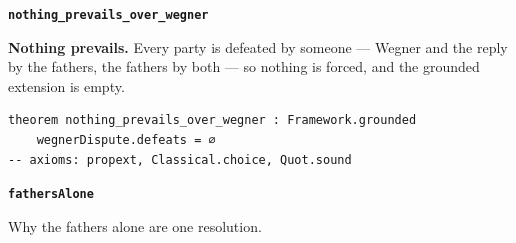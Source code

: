 \documentclass[11pt]{article}
\begin{document}
\par\medskip\noindent\textbf{\texttt{nothing\_\allowbreak{}prevails\_\allowbreak{}over\_\allowbreak{}wegner}}\par\nobreak\noindent
\textbf{Nothing prevails.} Every party is defeated by someone — Wegner and the reply by the fathers, the fathers by both — so nothing is forced, and the grounded extension is empty.

{\small\begin{verbatim}
theorem nothing_prevails_over_wegner : Framework.grounded
    wegnerDispute.defeats = ∅
-- axioms: propext, Classical.choice, Quot.sound
\end{verbatim}}
\par\medskip\noindent\textbf{\texttt{fathers\allowbreak{}Alone}}\par\nobreak\noindent
Why the fathers alone are one resolution.
\end{document}
